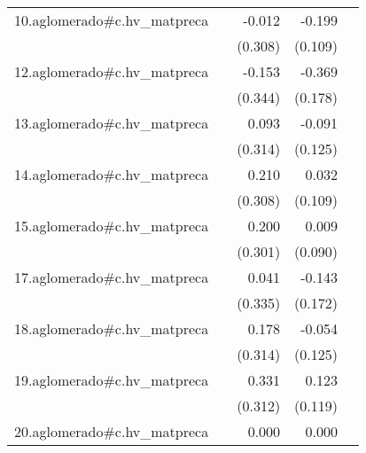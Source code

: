 {\begin{longtable}{l*{4}{D{.}{.}{-1}}}
\addlinespace
10.aglomerado#c.hv\_matpreca&                     &      -0.012         &      -0.199         &                     \\
            &                     &     (0.308)         &     (0.109)         &                     \\
\addlinespace
12.aglomerado#c.hv\_matpreca&                     &      -0.153         &      -0.369\sym{*}  &                     \\
            &                     &     (0.344)         &     (0.178)         &                     \\
\addlinespace
13.aglomerado#c.hv\_matpreca&                     &       0.093         &      -0.091         &                     \\
            &                     &     (0.314)         &     (0.125)         &                     \\
\addlinespace
14.aglomerado#c.hv\_matpreca&                     &       0.210         &       0.032         &                     \\
            &                     &     (0.308)         &     (0.109)         &                     \\
\addlinespace
15.aglomerado#c.hv\_matpreca&                     &       0.200         &       0.009         &                     \\
            &                     &     (0.301)         &     (0.090)         &                     \\
\addlinespace
17.aglomerado#c.hv\_matpreca&                     &       0.041         &      -0.143         &                     \\
            &                     &     (0.335)         &     (0.172)         &                     \\
\addlinespace
18.aglomerado#c.hv\_matpreca&                     &       0.178         &      -0.054         &                     \\
            &                     &     (0.314)         &     (0.125)         &                     \\
\addlinespace
19.aglomerado#c.hv\_matpreca&                     &       0.331         &       0.123         &                     \\
            &                     &     (0.312)         &     (0.119)         &                     \\
\addlinespace
20.aglomerado#c.hv\_matpreca&                     &       0.000         &       0.000         &                     \\

\end{longtable}}
